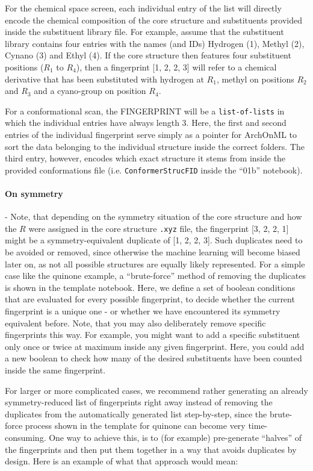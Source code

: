 \documentclass[12pt]{achemso}
\begin{document}
\noindent For the chemical space screen, each individual entry of the list will directly encode the chemical composition of the core structure and substituents provided inside the substituent library file. For example, assume that the substituent library contains four entries with the names (and IDs) Hydrogen (1), Methyl (2), Cynano (3) and Ethyl (4). If the core structure then features four substituent positions ($R_1$ to $R_4$), then a fingerprint [1, 2, 2, 3] will refer to a chemical derivative that has been substituted with hydrogen at $R_1$, methyl on positions $R_2$ and $R_3$ and a cyano-group on position $R_4$.

\noindent For a conformational scan, the FINGERPRINT will be a \texttt{list-of-lists} in which the individual entries have always length 3. Here, the first and second entries of the individual fingerprint serve simply as a pointer for ArchOnML to sort the data belonging to the individual structure inside the correct folders. The third entry, however, encodes which exact structure it stems from inside the provided conformations file (i.e. \texttt{ConformerStrucFID} inside the ``01b'' notebook).

\paragraph{On symmetry} - Note, that depending on the symmetry situation of the core structure and how the $R$ were assigned in the core structure \texttt{.xyz} file, the fingerprint [3, 2, 2, 1] might be a symmetry-equivalent duplicate of [1, 2, 2, 3]. Such duplicates need to be avoided or removed, since otherwise the machine learning will become biased later on, as not all possible structures are equally likely represented. For a simple case like the quinone example, a ``brute-force'' method of removing the duplicates is shown in the template notebook. Here, we define a set of boolean conditions that are evaluated for every possible fingerprint, to decide whether the current fingerprint is a unique one - or whether we have encountered its symmetry equivalent before. Note, that you may also deliberately remove specific fingerprints this way. For example, you might want to add a specific substituent only once or twice at maximum inside any given fingerprint. Here, you could add a new boolean to check how many of the desired substituents have been counted inside the same fingerprint.

\noindent For larger or more complicated cases, we recommend rather generating an already symmetry-reduced list of fingerprints right away instead of removing the duplicates from the automatically generated list step-by-step, since the brute-force process shown in the template for quinone can become very time-consuming. One way to achieve this, is to (for example) pre-generate ``halves'' of the fingerprints and then put them together in a way that avoids duplicates by design. Here is an example of what that approach would mean:\\
\end{document}
